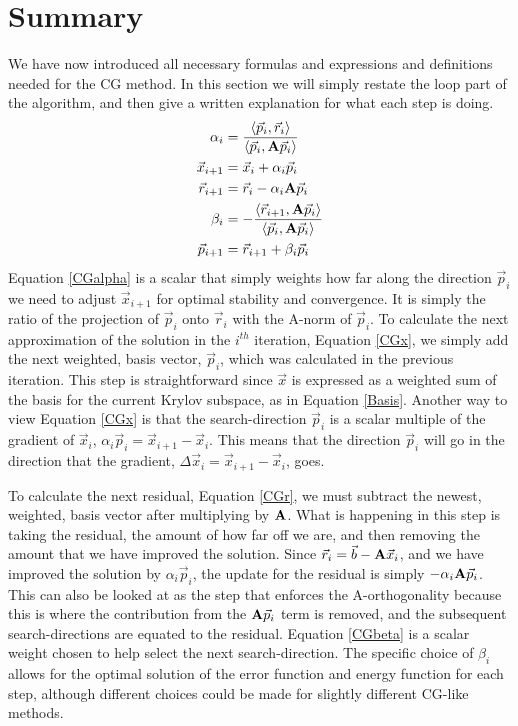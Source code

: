 \documentclass[11pt,letterpaper,oneside,notitlepage]{article}	%
\newcommand{\bfa}{{\bf A}}						%
\newcommand{\ip}[2]{\langle \vec #1,\vec #2 \rangle}	%
\newcommand{\aip}[2]{\langle \vec #1,\bfa\vec #2 \rangle}	%
\newcommand{\eq}[1]{Equation \eqref{#1}}		%
\newcommand{\pindent}[1]{\hspace{6mm}}  		%
\numberwithin{equation}{section}				%
\begin{document}
\section{Summary}%
\pindent{}We have now introduced all necessary formulas and expressions and definitions needed for the CG method. In this section we will simply restate the loop part of the algorithm, and then give a written explanation for what each step is doing.
\begin{align}
\alpha_i &= \dfrac{\ip{p_i}{r_i}}{\aip{p_i}{p_i}} \label{CGalpha} \\
\vec x_{i+1} &= \vec x_i + \alpha_i \vec p_i \label{CGx} \\
\vec r_{i+1} &= \vec r_i - \alpha_i \bfa \vec p_i \label{CGr} \\
\beta_i &=-\dfrac{\aip{r_{i+1}}{p_i}}{\aip{p_i}{p_i}} \label{CGbeta} \\
\vec p_{i+1} &= \vec r_{i+1} + \beta_i \vec p_i \label{CGp}
\end{align}
\eq{CGalpha} is a scalar that simply weights how far along the direction $\vec p_i$ we need to adjust $\vec x_{i+1}$ for optimal stability and convergence. It is simply the ratio of the projection of $\vec p_i$ onto $\vec r_i$ with the A-norm of $\vec p_i$. To calculate the next approximation of the solution in the $i^{th}$ iteration, \eq{CGx}, we simply add the next weighted, basis vector, $\vec p_i$, which was calculated in the previous iteration. This step is straightforward since $\vec x$ is expressed as a weighted sum of the basis for the current Krylov subspace, as in \eq{Basis}. Another way to view \eq{CGx} is that the search-direction $\vec p_i$ is a scalar multiple of the gradient of $\vec x_i$, $\alpha_i\vec p_i = \vec x_{i+1}-\vec x_i$. This means that the direction $\vec p_i$ will go in the direction that the gradient, $\Delta\vec x_i=\vec x_{i+1}-\vec x_i$, goes.

To calculate the next residual, \eq{CGr}, we must subtract the newest, weighted, basis vector after multiplying by $\bfa$. What is happening in this step is taking the residual, the amount of how far off we are, and then removing the amount that we have improved the solution. Since $\vec r_i = \vec b - \bfa \vec x_i$, and we have improved the solution by $\alpha_i\vec p_i$, the update for the residual is simply $-\alpha_i\bfa\vec p_i$. This can also be looked at as the step that enforces the A-orthogonality because this is where the contribution from the $\bfa\vec p_i$ term is removed, and the subsequent search-directions are equated to the residual. \eq{CGbeta} is a scalar weight chosen to help select the next search-direction. The specific choice of $\beta_i$ allows for the optimal solution of the error function and energy function for each step, although different choices could be made for slightly different CG-like methods.
\end{document}
